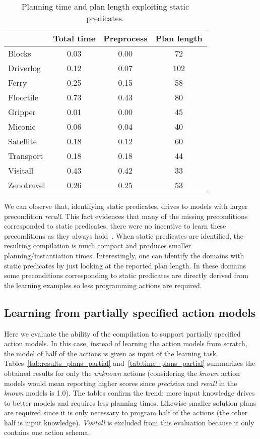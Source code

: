 \documentclass[letterpaper]{article} %
\begin{document}
\begin{table}
\begin{footnotesize}
	\begin{center}
		\begin{tabular}{l|c|c|c|}			
			 & Total time & Preprocess & Plan length  \\
			\hline
			Blocks & 0.03 & 0.00 & 72 \\
			Driverlog & 0.12 & 0.07 & 102 \\
			Ferry & 0.25 & 0.15 & 58 \\
			Floortile & 0.73 & 0.43 & 80 \\
			Gripper & 0.01 & 0.00 & 45 \\
			Miconic & 0.06 & 0.04 & 40 \\
			Satellite & 0.18 & 0.12 & 60 \\
			Transport & 0.18 & 0.18 & 44 \\
			Visitall & 0.43 & 0.42 & 33 \\
			Zenotravel & 0.26 & 0.25 & 53
		\end{tabular}
	\end{center}
        \end{footnotesize}
	\caption{\small Planning time and plan length exploiting static predicates.}
	\label{tab:time_plans_static}	
\end{table}

We can observe that, identifying static predicates, drives to models with larger precondition {\em recall}. This fact evidences that many of the missing preconditions corresponded to static predicates, there were no incentive to learn these preconditions as they always hold~\cite{gregory2015domain}. When static predicates are identified, the resulting compilation is much compact and produces smaller planning/instantiation times. Interestingly, one can identify the domains with static predicates by just looking at the reported plan length. In these domains some preconditions corresponding to static predicates are directly derived from the learning examples so less programming actions are required.


\subsection{Learning from partially specified action models}

Here we evaluate the ability of the compilation to support partially specified action models. In this case, instead of learning the action models from scratch, the model of half of the actions is given as input of the learning task. Tables~\ref{tab:results_plans_partial} and~\ref{tab:time_plans_partial} summarizes the obtained results for only the {\em unknown} actions (considering the {\em known} action models would mean reporting higher scores since {\em precision} and {\em recall} in the {\em known} models is 1.0). The tables confirm the trend: more input knowledge drives to better models and requires less planning times. Likewise smaller solution plans are required since it is only necessary to program half of the actions (the other half is input knowledge). {\em Visitall} is excluded from this evaluation because it only contains one action schema. 
\end{document}
